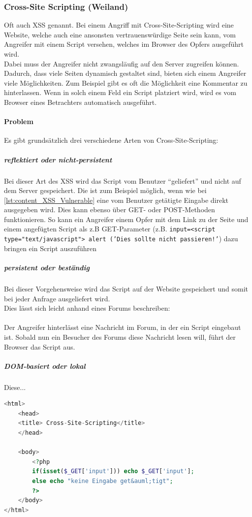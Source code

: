 \subsubsection{Cross-Site Scripting (Weiland)}
Oft auch XSS genannt. Bei einem Angriff mit Cross-Site-Scripting wird eine Website, welche auch eine ansonsten vertrauenswürdige Seite sein kann, vom Angreifer mit einem Script versehen, welches im Browser des Opfers ausgeführt wird.\\
Dabei muss der Angreifer nicht zwangsläufig auf den Server zugreifen können. Dadurch, dass viele Seiten dynamisch gestaltet sind, bieten sich einem Angreifer viele Möglichkeiten. Zum Beispiel gibt es oft die Möglichkeit eine Kommentar zu hinterlassen. Wenn in solch einem Feld ein Script platziert wird, wird es vom Browser eines Betrachters automatisch ausgeführt.
\paragraph{Problem}
Es gibt grundsätzlich drei verschiedene Arten von Cross-Site-Scripting:
\subparagraph{reflektiert oder nicht-persistent}
Bei dieser Art des XSS wird das Script vom Benutzer \enquote{geliefert} und nicht auf dem Server gespeichert. Die ist zum Beispiel möglich, wenn wie bei \autoref{lst:content_XSS_Vulnerable} eine vom Benutzer getätigte Eingabe direkt ausgegeben wird. Dies kann ebenso über GET- oder POST-Methoden funktionieren. So kann ein Angreifer einem Opfer mit dem Link zu der Seite und einem angefügten Script als z.B GET-Parameter (z.B. \texttt{input=<script type="text/javascript"> alert ('Dies sollte nicht passieren!'}) dazu bringen ein Script auszuführen
\subparagraph{persistent oder beständig}
Bei dieser Vorgehensweise wird das Script auf der Website gespeichert und somit bei jeder Anfrage ausgeliefert wird.\\ Dies lässt sich leicht anhand eines Forums beschreiben:\\\\
Der Angreifer hinterlässt eine Nachricht im Forum, in der ein Script eingebaut ist. Sobald nun ein Besucher des Forums diese Nachricht lesen will, führt der Browser das Script aus.
\subparagraph{DOM-basiert oder lokal}
Diese...
\begin{lstlisting}[style=custom, language=PHP, caption={Cross-Site-Scripting Anfällig},label={lst:content_XSS_Vulnerable}]
<html>
	<head>
	<title> Cross-Site-Scripting</title>
	</head>

	<body>
		<?php
		if(isset($_GET['input'])) echo $_GET['input'];
		else echo "keine Eingabe get&auml;tigt";			
		?>
	</body>
</html>
\end{lstlisting}




